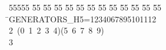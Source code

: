 %
%
\begin{tabbing}
55555 \= 55 \= 55 \= 55 \= 55 \= 55 \= 55 \= 55 \= 55 \= 55 \= 55 \= 55 \= 55 \= \>GENERATORS\_H5=1234067895101112\\[0pt]
2\>\ (0\ 1\ 2\ 3\ 4)(5\ 6\ 7\ 8\ 9)\\[0pt]
3\>\end{tabbing}
